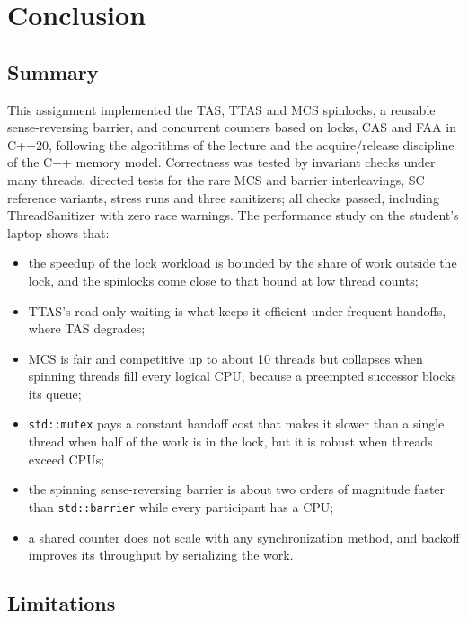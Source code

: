 \newpage
\section{Conclusion}\label{sec:conclusion}

\subsection{Summary}

This assignment implemented the TAS, TTAS and MCS spinlocks, a reusable sense-reversing barrier, and concurrent counters based on locks, CAS and FAA in C++20, following the algorithms of the lecture and the acquire/release discipline of the C++ memory model. Correctness was tested by invariant checks under many threads, directed tests for the rare MCS and barrier interleavings, SC reference variants, stress runs and three sanitizers; all checks passed, including ThreadSanitizer with zero race warnings. The performance study on the student's laptop shows that:

\begin{itemize}[leftmargin=1.5em]
  \item the speedup of the lock workload is bounded by the share of work outside the lock, and the spinlocks come close to that bound at low thread counts;
  \item TTAS's read-only waiting is what keeps it efficient under frequent handoffs, where TAS degrades;
  \item MCS is fair and competitive up to about 10 threads but collapses when spinning threads fill every logical CPU, because a preempted successor blocks its queue;
  \item \texttt{std::mutex} pays a constant handoff cost that makes it slower than a single thread when half of the work is in the lock, but it is robust when threads exceed CPUs;
  \item the spinning sense-reversing barrier is about two orders of magnitude faster than \texttt{std::barrier} while every participant has a CPU;
  \item a shared counter does not scale with any synchronization method, and backoff improves its throughput by serializing the work.
\end{itemize}

\subsection{Limitations}

